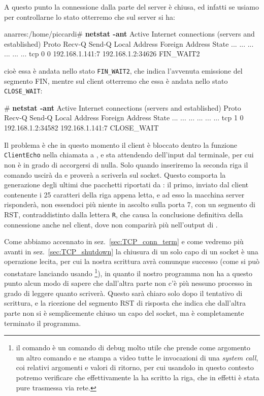 A questo punto la connessione dalla parte del server è chiusa, ed infatti se
usiamo  per controllarne lo stato otterremo che sul server si ha:
\begin{Console}
anarres:/home/piccardi# \textbf{netstat -ant}
Active Internet connections (servers and established)
Proto Recv-Q Send-Q Local Address           Foreign Address         State
...      ...    ... ...                     ...                     ...
tcp        0      0 192.168.1.141:7         192.168.1.2:34626       FIN_WAIT2
\end{Console}
cioè essa è andata nello stato \texttt{FIN\_WAIT2}, che indica l'avvenuta
emissione del segmento FIN, mentre sul client otterremo che essa è andata
nello stato \texttt{CLOSE\_WAIT}:
\begin{Console}
# \textbf{netstat -ant}
Active Internet connections (servers and established)
Proto Recv-Q Send-Q Local Address           Foreign Address         State
...      ...    ... ...                     ...                     ...
tcp        1      0 192.168.1.2:34582       192.168.1.141:7         CLOSE_WAIT 
\end{Console}

Il problema è che in questo momento il client è bloccato dentro la funzione
\texttt{ClientEcho} nella chiamata a , e sta attendendo dell'input
dal terminale, per cui non è in grado di accorgersi di nulla. Solo quando
inseriremo la seconda riga il comando uscirà da  e proverà a
scriverla sul socket. Questo comporta la generazione degli ultimi due
pacchetti riportati da : il primo, inviato dal client contenente
i 25 caratteri della riga appena letta, e ad esso la macchina server
risponderà, non essendoci più niente in ascolto sulla porta 7, con un segmento
di RST, contraddistinto dalla lettera \texttt{R}, che causa la conclusione
definitiva della connessione anche nel client, dove non comparirà più
nell'output di .

Come abbiamo accennato in sez.~\ref{sec:TCP_conn_term} e come vedremo più
avanti in sez.~\ref{sec:TCP_shutdown} la chiusura di un solo capo di un socket
è una operazione lecita, per cui la nostra scrittura avrà comunque successo
(come si può constatare lanciando usando \footnote{il comando
   è un comando di debug molto utile che prende come argomento un
  altro comando e ne stampa a video tutte le invocazioni di una \textit{system
    call}, coi relativi argomenti e valori di ritorno, per cui usandolo in
  questo contesto potremo verificare che effettivamente la  ha
  scritto la riga, che in effetti è stata pure trasmessa via rete.}), in
quanto il nostro programma non ha a questo punto alcun modo di sapere che
dall'altra parte non c'è più nessuno processo in grado di leggere quanto
scriverà. Questo sarà chiaro solo dopo il tentativo di scrittura, e la
ricezione del segmento RST di risposta che indica che dall'altra parte non si
è semplicemente chiuso un capo del socket, ma è completamente terminato il
programma.

